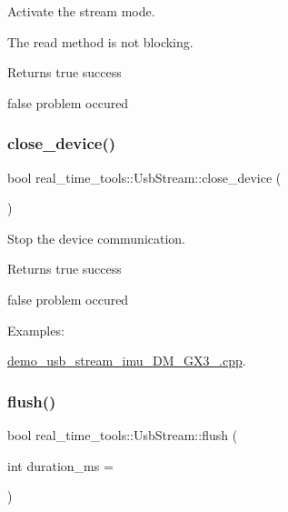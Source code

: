 Activate the stream mode. 

The read method is not blocking.

\begin{DoxyReturn}{Returns}
true success 

false problem occured 
\end{DoxyReturn}
\mbox{\label{classreal__time__tools_1_1UsbStream_acea75055bb37f2a7f351300dbaf28d9e}} 
\subsubsection{\texorpdfstring{close\+\_\+device()}{close\_device()}}
{\footnotesize\ttfamily bool real\+\_\+time\+\_\+tools\+::\+Usb\+Stream\+::close\+\_\+device (\begin{DoxyParamCaption}{ }\end{DoxyParamCaption})}



Stop the device communication. 

\begin{DoxyReturn}{Returns}
true success 

false problem occured 
\end{DoxyReturn}
\begin{Desc}
\item[Examples\+: ]\par
\hyperlink{demo_usb_stream_imu_3DM_GX3_25_8cpp-example}{demo\+\_\+usb\+\_\+stream\+\_\+imu\+\_\+D\+M\+\_\+\+G\+X3\+\_.\+cpp}.\end{Desc}
\mbox{\label{classreal__time__tools_1_1UsbStream_a0bc5fb5783f1833341d55b9b013be6c6}} 
\subsubsection{\texorpdfstring{flush()}{flush()}}
{\footnotesize\ttfamily bool real\+\_\+time\+\_\+tools\+::\+Usb\+Stream\+::flush (\begin{DoxyParamCaption}\item[{int}]{duration\+\_\+ms = {} }\end{DoxyParamCaption})}



